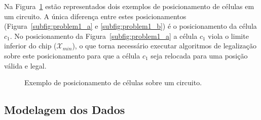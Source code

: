 Na Figura~\ref{fig:problem1} estão representados dois exemplos de posicionamento de células em um circuito.
A única diferença entre estes posicionamentos (Figura~\ref{subfig:problem1_a} e  \ref{subfig:problem1_b}) é o posicionamento da célula $c_1$.
No posicionamento da Figura~\ref{subfig:problem1_a} a célula $c_1$ viola o limite inferior do chip ($\mathcal{X}_{min}$), o que torna necessário executar algoritmos de legalização sobre este posicionamento para que a célula $c_1$ seja relocada para uma posição válida e legal.

\begin{figure}[ht]
    \centering
    \hspace{1cm}
    \caption{Exemplo de posicionamento de células sobre um circuito.}
    \label{fig:problem1}
\end{figure}

\subsection{Modelagem dos Dados}


